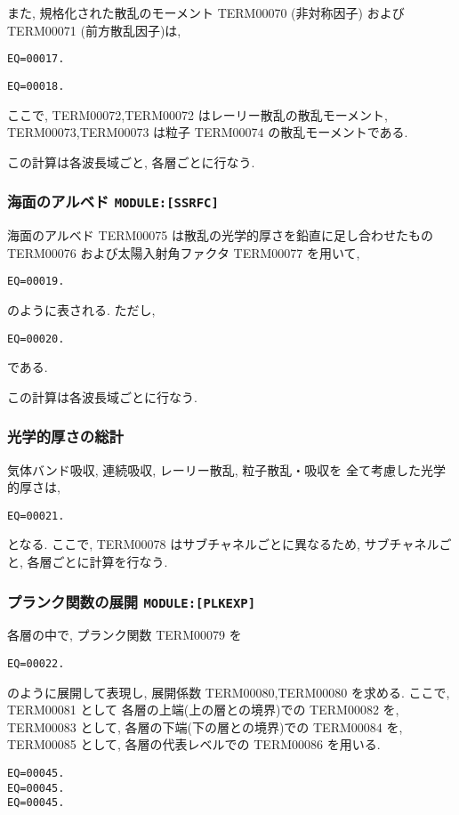また, 規格化された散乱のモーメント 
TERM00070 (非対称因子) および TERM00071 (前方散乱因子)は,
\begin{verbatim}
EQ=00017.
\end{verbatim}
\begin{verbatim}
EQ=00018.
\end{verbatim}
ここで, TERM00072,TERM00072 はレーリー散乱の散乱モーメント,
TERM00073,TERM00073 は粒子 TERM00074 の散乱モーメントである.

この計算は各波長域ごと, 各層ごとに行なう.

\subsubsection{海面のアルベド \texttt{MODULE:[SSRFC]}}

海面のアルベド TERM00075 は散乱の光学的厚さを鉛直に足し合わせたもの
TERM00076 および太陽入射角ファクタ TERM00077 を用いて,
\begin{verbatim}
EQ=00019.
\end{verbatim}
のように表される.
ただし,
\begin{verbatim}
EQ=00020.
\end{verbatim}
である.

この計算は各波長域ごとに行なう.

\subsubsection{光学的厚さの総計}

気体バンド吸収, 連続吸収, レーリー散乱, 粒子散乱・吸収を
全て考慮した光学的厚さは, 
%
\begin{verbatim}
EQ=00021.
\end{verbatim}
%
となる. ここで, TERM00078 はサブチャネルごとに異なるため,
サブチャネルごと, 各層ごとに計算を行なう.

\subsubsection{プランク関数の展開 \texttt{MODULE:[PLKEXP]}}

各層の中で, プランク関数 TERM00079 を
\begin{verbatim}
EQ=00022.
\end{verbatim}
のように展開して表現し, 展開係数 TERM00080,TERM00080 を求める.
ここで, TERM00081 として
各層の上端(上の層との境界)での TERM00082 を,
TERM00083 として, 各層の下端(下の層との境界)での TERM00084 を,
TERM00085 として, 各層の代表レベルでの TERM00086 を用いる.
\begin{verbatim}
EQ=00045.
EQ=00045.
EQ=00045.
\end{verbatim}


